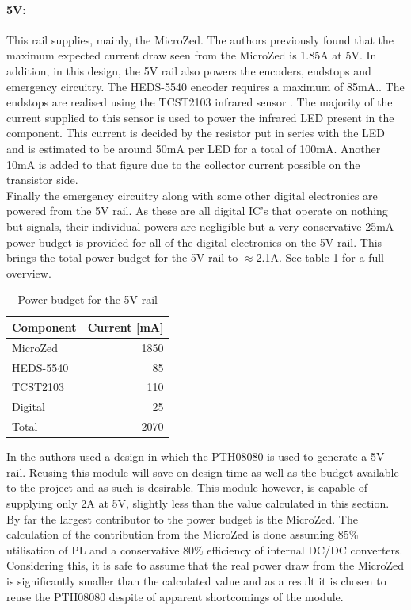 \paragraph{5V:} %
\label{par:5v}
This rail supplies, mainly, the MicroZed.
The authors previously found \cite{isaswarm} that the maximum expected current draw seen from the MicroZed is 1.85A at 5V.
In addition, in this design, the 5V rail also powers the encoders, endstops and emergency circuitry.
The HEDS-5540 \cite{heds5540} encoder requires a maximum of 85mA..
The endstops are realised using the TCST2103 infrared sensor \cite{tcst2103}.
The majority of the current supplied to this sensor is used to power the infrared LED present in the component.
This current is decided by the resistor put in series with the LED and is estimated to be around 50mA per LED for a total of 100mA.
Another 10mA is added to that figure due to the collector current possible on the transistor side.\\
Finally the emergency circuitry along with some other digital electronics are powered from the 5V rail.
As these are all digital IC's that operate on nothing but signals, their individual powers are negligible but a very conservative 25mA power budget is provided for all of the digital electronics on the 5V rail. This brings the total power budget for the 5V rail to $\approx$2.1A.
See table \ref{tab:5vpowerbudget} for a full overview.

\begin{table}
	\centering
	\begin{tabular}{l|r}
		 Component & Current [mA]\\
		 \hline
		 MicroZed & 1850\\
		 HEDS-5540 & 85\\
		 TCST2103 & 110\\
		 Digital & 25\\
		 \hline
		 Total & 2070
	\end{tabular}
	\caption{Power budget for the 5V rail}
	\label{tab:5vpowerbudget}
\end{table}

In \cite{isaswarm} the authors used a design in which the PTH08080 is used to generate a 5V rail.
Reusing this module will save on design time as well as the budget available to the project and as such is desirable.
This module however, is capable of supplying only 2A at 5V, slightly less than the value calculated in this section.
By far the largest contributor to the power budget is the MicroZed.
The calculation of the contribution from the MicroZed is done assuming 85\% utilisation of PL and a conservative 80\% efficiency of internal DC/DC converters.
Considering this, it is safe to assume that the real power draw from the MicroZed is significantly smaller than the calculated value and as a result it is chosen to reuse the PTH08080 despite of apparent shortcomings of the module.

